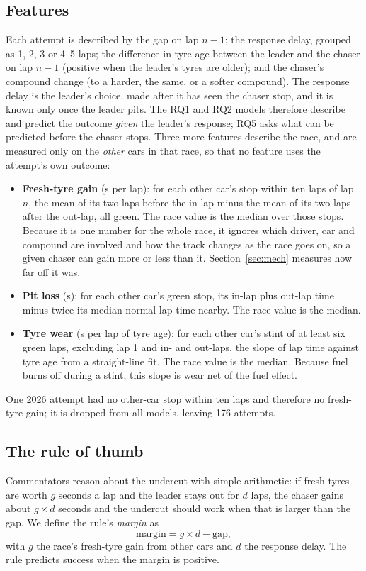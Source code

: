 \documentclass[12pt]{article}
\begin{document}
\subsection{Features}
Each attempt is described by the gap on lap $n-1$; the response delay, grouped as 1, 2, 3 or 4--5 laps; the difference in tyre age between the leader and the chaser on lap $n-1$ (positive when the leader's tyres are older); and the chaser's compound change (to a harder, the same, or a softer compound). The response delay is the leader's choice, made after it has seen the chaser stop, and it is known only once the leader pits. The RQ1 and RQ2 models therefore describe and predict the outcome \emph{given} the leader's response; RQ5 asks what can be predicted before the chaser stops. Three more features describe the race, and are measured only on the \emph{other} cars in that race, so that no feature uses the attempt's own outcome:
\begin{itemize}
\item \textbf{Fresh-tyre gain} (s per lap): for each other car's stop within ten laps of lap $n$, the mean of its two laps before the in-lap minus the mean of its two laps after the out-lap, all green. The race value is the median over those stops. Because it is one number for the whole race, it ignores which driver, car and compound are involved and how the track changes as the race goes on, so a given chaser can gain more or less than it. Section~\ref{sec:mech} measures how far off it was.
\item \textbf{Pit loss} (s): for each other car's green stop, its in-lap plus out-lap time minus twice its median normal lap time nearby. The race value is the median.
\item \textbf{Tyre wear} (s per lap of tyre age): for each other car's stint of at least six green laps, excluding lap 1 and in- and out-laps, the slope of lap time against tyre age from a straight-line fit. The race value is the median. Because fuel burns off during a stint, this slope is wear net of the fuel effect.
\end{itemize}
One 2026 attempt had no other-car stop within ten laps and therefore no fresh-tyre gain; it is dropped from all models, leaving 176 attempts. %

\subsection{The rule of thumb}
Commentators reason about the undercut with simple arithmetic: if fresh tyres are worth $g$ seconds a lap and the leader stays out for $d$ laps, the chaser gains about $g \times d$ seconds and the undercut should work when that is larger than the gap. We define the rule's \emph{margin} as
\[
\text{margin} = g \times d - \text{gap},
\]
with $g$ the race's fresh-tyre gain from other cars and $d$ the response delay. The rule predicts success when the margin is positive.
\end{document}
